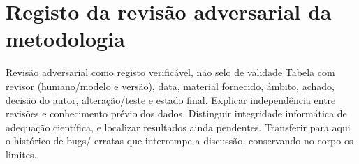 
\chapter{Registo da revisão adversarial da metodologia}
\label{app:adversarial}
{Revisão adversarial como registo verificável, não selo de validade}
{Tabela com revisor (humano/modelo e versão), data, material fornecido,
âmbito, achado, decisão do autor, alteração/teste e estado final.
Explicar independência entre revisões e conhecimento prévio dos dados.
Distinguir integridade informática de adequação científica, e localizar
resultados ainda pendentes. Transferir para aqui o histórico de bugs/
erratas que interrompe a discussão, conservando no corpo os limites.}%


